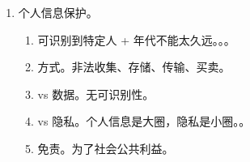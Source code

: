\begin{enumerate}
\begin{enumerate}
\begin{enumerate}
\begin{enumerate}
                          \item 丑化。。
                          \item 污损。
                          \item 伪造。。
                          \item 合理使用制度。实时新闻报道、职务行为（）、寻人启事。
                          \item 用的一定是被侵犯的那个人的肖像！！
                                。
                        \end{enumerate}
                  \item 姓名、肖像的许可使用。。
                  \item 名誉。
                        \begin{enumerate}
                          \item 贬低（负面社会评价）。含信用。。
                          \item 侮辱。
                          \item 诽谤。捏造散布虚假事实。文学作品真人真事为对象算侵权。
                          \item 披露“客观事实”不属于。。
                        \end{enumerate}
                  \item 荣誉。如光荣称号。剥夺、诋毁、贬损。。
                  \item 隐私。私密空间（扩大解释，）、活动、信息、私人生活安宁。常考。
                        \begin{enumerate}
                          \item 刺探、侵扰、泄露、公开。诽谤不构成对隐私权的侵害。
                          \item {}。
                        \end{enumerate}
                  \item 婚姻自主。从来不考。
                \end{enumerate}
        \end{enumerate}
  \item 个人信息保护。
        \begin{enumerate}
          \item 可识别到特定人 + 年代不能太久远。。。
          \item 方式。非法收集、存储、传输、买卖。
          \item vs 数据。无可识别性。
          \item vs 隐私。个人信息是大圈，隐私是小圈。。
          \item 免责。为了社会公共利益。
        \end{enumerate}
\end{enumerate}
